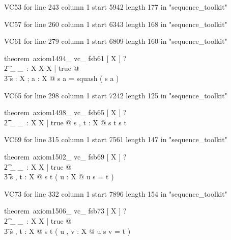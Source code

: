 \documentclass{article}
\begin{document}
VC53 for line 243 column 1 start 5942 length 177 in "sequence_toolkit"

VC57 for line 260 column 1 start 6343 length 168 in "sequence_toolkit"

VC61 for line 279 column 1 start 6809 length 160 in "sequence_toolkit"
\begin{zed}
theorem~axiom1494\_ vc\_ fsb61 [ X ] \vdash ? \\
   \t2 \exists \_ \filter \_~: \seq X \cross \power X \fun \seq X | true @ \\
    \t3 \forall s : \seq X ; a : \power X @ s \filter a = squash ( s \rres a )
\end{zed}

VC65 for line 298 column 1 start 7242 length 125 in "sequence_toolkit"
\begin{zed}
theorem~axiom1498\_ vc\_ fsb65 [ X ] \vdash ? \\
   \t2 \exists \_ \prefix \_~: \seq X \rel \seq X | true @ \forall s , t : \seq X @ s \prefix t \iff s \subseteq t
\end{zed}

VC69 for line 315 column 1 start 7561 length 147 in "sequence_toolkit"
\begin{zed}
theorem~axiom1502\_ vc\_ fsb69 [ X ] \vdash ? \\
   \t2 \exists \_ \suffix \_~: \seq X \rel \seq X | true @ \\
    \t3 \forall s , t : \seq X @ s \suffix t \iff ( \exists u : \seq X @ u \cat s = t )
\end{zed}

VC73 for line 332 column 1 start 7896 length 154 in "sequence_toolkit"
\begin{zed}
theorem~axiom1506\_ vc\_ fsb73 [ X ] \vdash ? \\
   \t2 \exists \_ \infix \_~: \seq X \rel \seq X | true @ \\
    \t3 \forall s , t : \seq X @ s \infix t \iff ( \exists u , v : \seq X @ u \cat s \cat v = t )
\end{zed}
\end{document}
